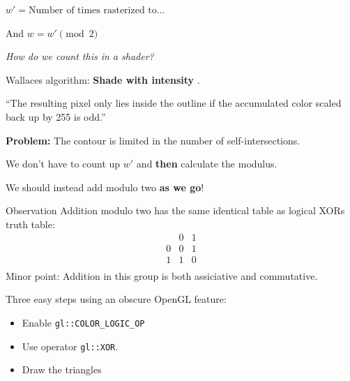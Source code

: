 \documentclass[14pt]{beamer}
\begin{document}
\begin{frame}
    \centering
    $w' = \text{Number of times rasterized to...}$

    \vspace{1.5em}
    And $w = w' \pmod 2$

    \vspace{1.5em}
    \textit{How do we count this in a shader?}
\end{frame}

\begin{frame}
    Wallaces algorithm: \textbf{Shade with intensity }.
    \begin{displayquote}
        ``The resulting pixel only lies inside the outline if the accumulated color scaled back up by 255 is odd.''
    \end{displayquote}
    \pause
    \textbf{Problem:} The contour is limited in the number of self-intersections.
\end{frame}

\begin{frame}
    \centering
    We don't have to count up $w'$ and \textbf{then} calculate the modulus.
\end{frame}

\begin{frame}
    \centering
    We should instead add modulo two \textbf{as we go}!

    \pause
    \vspace{1em}
    \begin{block}{Observation}
        Addition modulo two has the same identical table as logical XORs truth table:
        $$
        \begin{array}{c|cc}
              & 0 & 1 \\
            \hline
            0 & 0 & 1 \\
            1 & 1 & 0 \\ 
        \end{array}
        $$
        Minor point: Addition in this group is both assiciative and commutative.
    \end{block}
\end{frame}

\begin{frame}
    \centering
    Three easy steps using an obscure OpenGL feature:
    \vspace{1em}


    \begin{itemize}
    \item Enable \texttt{gl::COLOR\_LOGIC\_OP} 
    \item Use operator \texttt{gl::XOR}.
    \item Draw the triangles
    \end{itemize}
\end{frame}
\end{document}
